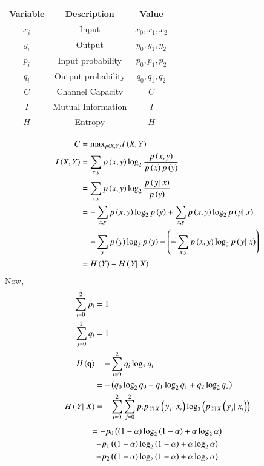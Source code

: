 \documentclass[journal,12pt,twocolumn]{IEEEtran}
\theoremstyle{remark}
\begin{document}
\begin{tabular}{|c|c|c|} \hline
Variable & Description & Value\\\hline
$x_i$ & Input & $x_0 , x_1, x_2$\\\hline
$y_i$ & Output & $y_0 , y_1, y_2$\\\hline
$p_i$ & Input probability & $ p_0, p_1, p_2 $\\\hline
$q_i$ & Output probability & $  q_0, q_1, q_2 $\\\hline
$C$ & Channel Capacity & $C$\\\hline
$I$ & Mutual Information & $I$ \\\hline
$H$ & Entropy & $H$ \\\hline
\end{tabular}
\begin{align}
C &=\text{max}_{p\left(X,Y\right)} I\left(X,Y\right)\\
I\left(X,Y\right) &= \sum_{x,y}p\left(x,y\right)\log_2\frac{p\left(x,y\right)}{p\left(x\right)p\left(y\right)}\\
&= \sum_{x,y}p\left(x,y\right)\log_2\frac{p\left(\left.{y}|\right.{x}\right)}{p\left(y\right)}\\
&=-\sum_{x,y}p\left(x,y\right)\log_2p\left(y\right)+\sum_{x,y}p\left(x,y\right)\log_2p\left(\left.{y}|\right.{x}\right)\\
&=-\sum_{y}p\left(y\right)\log_2p\left(y\right)-\left(-\sum_{x,y}p\left(x,y\right)\log_2p\left(\left.{y}|\right.{x}\right)\right)\\
&= H\left(Y\right) - H\left(\left.{Y}|\right.{X}\right)\label{eq:1}
\end{align}
Now,
\begin{align}
\sum_{i=0}^2p_i&=1\\
 \sum_{j=0}^2q_i&=1\\
H\left(\mathbf{q}\right) &= - \sum_{i=0}^2 q_i\log_2 q_i\\
&= -\left(q_0\log_2 q_0 + q_1\log_2 q_1 +q_2\log_2 q_2\right)\label{eq:2}\\
H\left(\left.{Y}|\right.{X}\right) &= -\sum_{i=0}^2 \sum_{j=0}^2p_ip_{\left.{Y}|\right.{X}}\left({\left.{y_j}|\right.{x_i}}\right)\log_2\left(p_{\left.{Y}|\right.{X}}\left({\left.{y_j}|\right.{x_i}}\right)\right)
\end{align}
\begin{multline}
= -p_0\left(\left(1-\alpha\right) \log_2 \left(1-\alpha\right) + \alpha \log_2 \alpha\right)\\-p_1\left(\left(1-\alpha\right) \log_2 \left(1-\alpha\right) + \alpha \log_2 \alpha\right)\\-p_2\left(\left(1-\alpha\right) \log_2 \left(1-\alpha\right) + \alpha \log_2 \alpha\right)\label{eq:3}
\end{multline}
\end{document}
